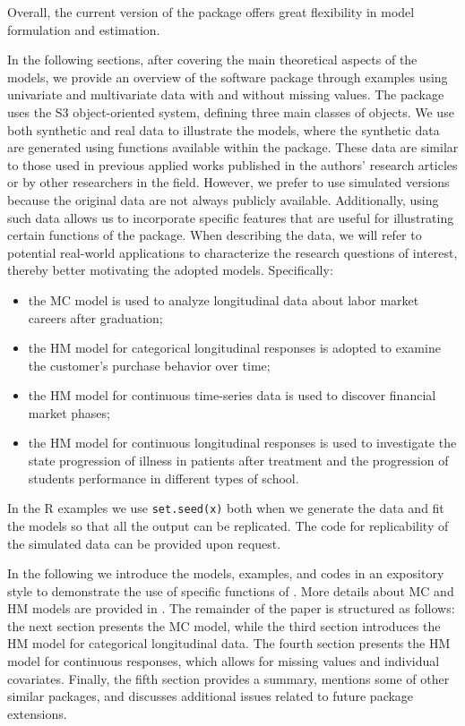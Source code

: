 \noindent Overall, the current version of the package offers great
flexibility in model formulation and estimation.

In the following sections, after covering the main theoretical aspects
of the models, we provide an overview of the  software
package through examples using univariate and multivariate data with and
without missing values. The package uses the S3 object-oriented system,
defining three main classes of objects.
We use both synthetic and real data to illustrate the models, where the synthetic data are generated using functions available within the package.
These data are similar to those used in previous applied works published
in the authors' research articles or by other researchers in the field.
However, we prefer to use simulated versions because the original data
are not always publicly available. Additionally, using such data allows
us to incorporate specific features that are useful for illustrating
certain functions of the package.
When describing the data, we will refer to potential real-world
applications to characterize the research questions of interest, thereby
better motivating the adopted models. Specifically:

\begin{itemize}
\item
  the MC model is used to analyze longitudinal data about labor market
  careers after graduation;
\item
  the HM model for categorical longitudinal responses is adopted to
  examine the customer's purchase behavior over time;
\item
  the HM model for continuous time-series data is used to discover financial market phases;
\item
  the HM model for continuous longitudinal responses is used to
  investigate the state progression of illness in patients after
  treatment and the progression of students
  performance in different types of school.
\end{itemize}

In the \textsf{R} examples we use \texttt{set.seed(x)} both when we generate
the data and fit the models so that all the output can be replicated.
The code for replicability of the simulated data can be provided upon
request.

In the following we introduce the models, examples, and codes in an
expository style to demonstrate the use of specific functions of
. More details about MC and HM models are provided in
\cite{bart:farc:penn:13, bart:farc:penn:14}.
The remainder of the paper is structured as follows: the next section presents
the MC model, while the third section introduces the HM model for
categorical longitudinal data. The fourth section presents the HM model
for continuous responses, which allows for missing values and individual
covariates. Finally, the fifth section provides a summary, mentions some
of other similar packages, and discusses additional issues related to
future package extensions.


